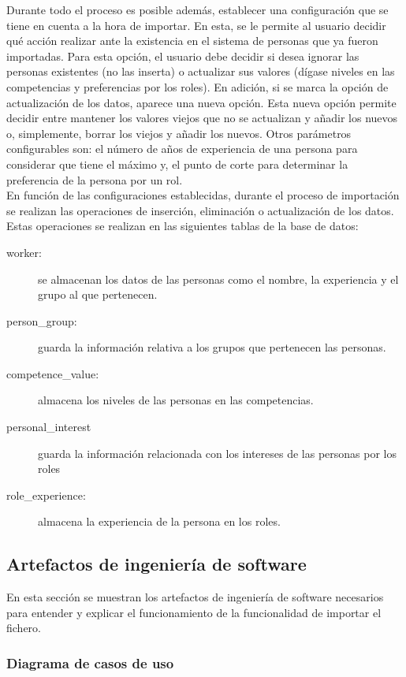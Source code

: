 Durante todo el proceso es posible además, establecer una configuración que se tiene en cuenta a la hora de importar. En esta, se le permite al usuario decidir qué acción realizar ante la existencia en el sistema de personas que ya fueron importadas. Para esta opción, el usuario debe decidir si desea ignorar las personas existentes (no las inserta) o actualizar sus valores (dígase niveles en las competencias y preferencias por los roles). En adición, si se marca la opción de actualización de los datos, aparece una nueva opción. Esta nueva opción permite decidir entre mantener los valores viejos que no se actualizan y añadir los nuevos o, simplemente, borrar los viejos y añadir los nuevos. Otros parámetros configurables son: el número de años de experiencia de una persona para considerar que tiene el máximo y, el punto de corte para determinar la preferencia de la persona por un rol. \\

En función de las configuraciones establecidas, durante el proceso de importación se realizan las operaciones de inserción, eliminación o actualización de los datos. Estas operaciones se realizan en las siguientes tablas de la base de datos:
\begin{description}
	\item[worker:] se almacenan los datos de las personas como el nombre, la experiencia y el grupo al que pertenecen.
	\item[person\_group:] guarda la información relativa a los grupos que pertenecen las personas.
	\item[competence\_value:] almacena los niveles de las personas en las competencias. 
	\item[personal\_interest] guarda la información relacionada con los intereses de las personas por los roles 
	\item[role\_experience:] almacena la experiencia de la persona en los roles.
\end{description}

\subsection{Artefactos de ingeniería de software}

En esta sección se muestran los artefactos de ingeniería de software necesarios para entender y explicar el funcionamiento de la funcionalidad de importar el fichero.

\subsubsection{Diagrama de casos de uso}

